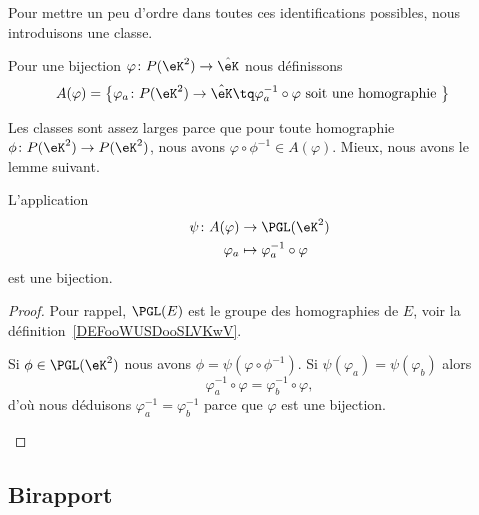 Pour mettre un peu d'ordre dans toutes ces identifications possibles, nous introduisons une classe.

\begin{definition}      \label{DEFooMLQUooGwvQMh}
	Pour une bijection \( \varphi\colon P(\eK^2)\to \hat\eK\) nous définissons
	\begin{equation}
		\begin{aligned}[]
			A(\varphi)=\big\{  \varphi_a\colon P(\eK^2) & \to \hat\eK \tq \varphi_a^{-1}\circ\varphi
			\text{ soit une homographie } \big\}
		\end{aligned}
	\end{equation}
\end{definition}

Les classes sont assez larges parce que pour toute homographie \( \phi\colon P(\eK^2)\to P(\eK^2)\), nous avons \( \varphi\circ\phi^{-1}\in A(\varphi)\). Mieux, nous avons le lemme suivant.

\begin{lemma}
	L'application
	\begin{equation}
		\begin{aligned}
			\psi\colon A(\varphi) & \to \PGL(\eK^2)                    \\
			\varphi_a             & \mapsto \varphi_a^{-1}\circ\varphi
		\end{aligned}
	\end{equation}
	est une bijection.
\end{lemma}

\begin{proof}
	Pour rappel, \( \PGL(E)\) est le groupe des homographies de \( E\), voir la définition~\ref{DEFooWUSDooSLVKwV}.
	\begin{subproof}
		\spitem[Surjectif]
		Si \( \phi\in\PGL(\eK^2)\) nous avons \( \phi=\psi(\varphi\circ\phi^{-1})\).
		\spitem[Injectif]
		Si \( \psi(\varphi_a)=\psi(\varphi_b)\) alors
		\begin{equation}
			\varphi_a^{-1}\circ\varphi=\varphi_b^{-1}\circ\varphi,
		\end{equation}
		d'où nous déduisons \( \varphi_a^{-1}=\varphi_b^{-1}\) parce que \( \varphi\) est une bijection.
	\end{subproof}
\end{proof}

\subsection{Birapport}

